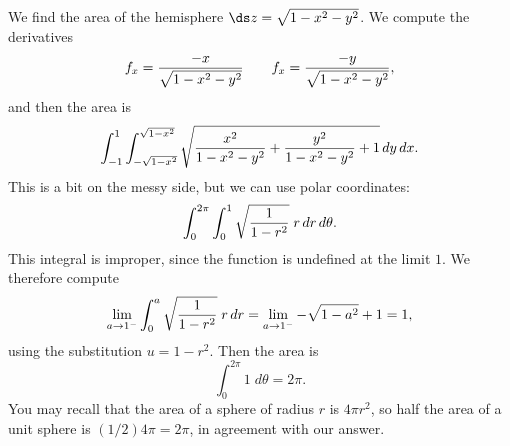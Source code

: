 \begin{example} We find the area of the hemisphere $\ds z=\sqrt{1-x^2-y^2}$. We
compute the derivatives
$$f_x={-x\over\sqrt{1-x^2-y^2}} \qquad
f_x={-y\over\sqrt{1-x^2-y^2}},$$
and then the area is
$$\int_{-1}^{1}\int_{-\sqrt{1-x^2}}^{\sqrt{1-x^2}}
\sqrt{ {x^2\over1-x^2-y^2}+{y^2\over1-x^2-y^2}+1}\,dy\,dx.$$
This is a bit on the messy side, but we can use polar coordinates:
$$
\int_{0}^{2\pi}\int_{0}^{1}
\sqrt{ {1\over1-r^2}}\;r\,dr\,d\theta.$$
This integral is improper, since the function is undefined at the
limit $1$. We therefore compute
$$\lim_{a\to1^-}\int_{0}^{a}
\sqrt{ {1\over1-r^2}}\;r\,dr=\lim_{a\to1^-}-\sqrt{1-a^2}+1=1,$$
using the substitution $u=1-r^2$. Then the area is 
$$\int_{0}^{2\pi}1\;d\theta=2\pi.$$
You may
recall that the area of a sphere of radius $r$ is $4\pi r^2$, so half
the area of a unit sphere is $(1/2)4\pi=2\pi$, in agreement with our
answer. 
\end{example}

